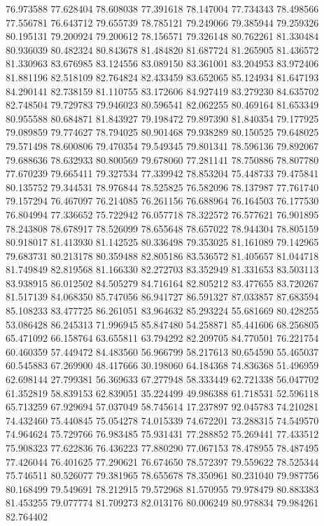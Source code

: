 76.973588
77.628404
78.608038
77.391618
78.147004
77.734343
78.498566
77.556781
76.643712
79.655739
78.785121
79.249066
79.385944
79.259326
80.195131
79.200924
79.200612
78.156571
79.326148
80.762261
81.330484
80.936039
80.482324
80.843678
81.484820
81.687724
81.265905
81.436572
81.330963
83.676985
83.124556
83.089150
83.361001
83.204953
83.972406
81.881196
82.518109
82.764824
82.433459
83.652065
85.124934
81.647193
84.290141
82.738159
81.110755
83.172606
84.927419
83.279230
84.635702
82.748504
79.729783
79.946023
80.596541
82.062255
80.469164
81.653349
80.955588
80.684871
81.843927
79.198472
79.897390
81.840354
79.177925
79.089859
79.774627
78.794025
80.901468
79.938289
80.150525
79.648025
79.571498
78.600806
79.470354
79.549345
79.801341
78.596136
79.892067
79.688636
78.632933
80.800569
79.678060
77.281141
78.750886
78.807780
77.670239
79.665411
79.327534
77.339942
78.853204
75.448733
79.475841
80.135752
79.344531
78.976844
78.525825
76.582096
78.137987
77.761740
79.157294
76.467097
76.214085
76.261156
76.688964
76.164503
76.177530
76.804994
77.336652
75.722942
76.057718
78.322572
76.577621
76.901895
78.243808
78.678917
78.526099
78.655648
78.657022
78.944304
78.805159
80.918017
81.413930
81.142525
80.336498
79.353025
81.161089
79.142965
79.683731
80.213178
80.359488
82.805186
83.536572
81.405657
81.044718
81.749849
82.819568
81.166330
82.272703
83.352949
81.331653
83.503113
83.938915
86.012502
84.505279
84.716164
82.805212
83.477655
83.720267
81.517139
84.068350
85.747056
86.941727
86.591327
87.033857
87.683594
85.108233
83.477725
86.261051
83.964632
85.293224
55.681669
80.428255
53.086428
86.245313
71.996945
85.847480
54.258871
85.441606
68.256805
65.471092
66.158764
63.655811
63.794292
82.209705
84.770501
76.221754
60.460359
57.449472
84.483560
56.966799
58.217613
80.654590
55.465037
60.545883
67.269900
48.417666
30.198060
64.184368
74.836368
51.496959
62.698144
27.799381
56.369633
67.277948
58.333449
62.721338
56.047702
61.352819
58.839153
62.839051
35.224499
49.986388
61.718531
52.596118
65.713259
67.929694
57.037049
58.745614
17.237897
92.045783
74.210281
74.432460
75.440845
75.054278
74.015339
74.672201
73.288315
74.549570
74.964624
75.729766
76.983485
75.931431
77.288852
75.269441
77.433512
75.908323
77.622836
76.436223
77.880290
77.067153
78.478955
78.487495
77.426044
76.401625
77.290621
76.674650
78.572397
79.559622
78.525344
75.746511
80.526077
79.381965
78.655678
78.350961
80.231040
79.987756
80.168499
79.549691
78.212915
79.572968
81.570955
79.978479
80.883383
81.453255
79.077774
81.709273
82.013176
80.006249
80.978834
79.984261
82.764402
